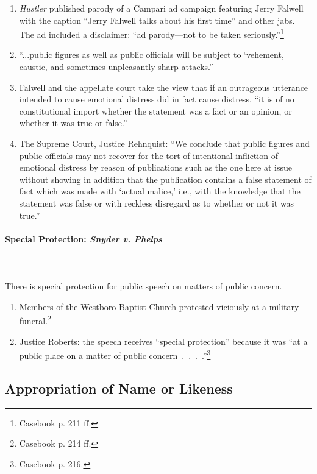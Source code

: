\begin{enumerate}
    \item \emph{Hustler} published parody of a Campari ad campaign featuring 
    Jerry Falwell with the caption ``Jerry Falwell talks about his first 
    time'' and other jabs. The ad included a disclaimer: ``ad parody---not to 
    be taken seriously.''\footnote{Casebook p. 211 ff.}
    \item ``...public figures as well as public officials will be subject to 
    `vehement, caustic, and sometimes unpleasantly sharp 
    attacks.''
    \item Falwell and the appellate court take the view that if an outrageous 
    utterance intended to cause emotional distress did in fact cause distress, 
    ``it is of no constitutional import whether the statement was a fact or an 
    opinion, or whether it was true or false.''
    \item The Supreme Court, Justice Rehnquist: ``We conclude that public 
    figures and public officials may not recover for the tort of intentional 
    infliction of emotional distress by reason of publications such as the one 
    here at issue without showing in addition that the publication contains a 
    false statement of fact which was made with `actual malice,' i.e., with 
    the knowledge that the statement was false or with reckless disregard as 
    to whether or not it was true.''
\end{enumerate}

\paragraph{Special Protection: \emph{Snyder v. Phelps}}
~\\\\
There is special protection for public speech on matters of public concern.

\begin{enumerate}
    \item Members of the Westboro Baptist Church protested viciously at a 
    military funeral.\footnote{Casebook p. 214 ff.}
    \item Justice Roberts: the speech receives ``special protection'' because it 
    was ``at a public place on a matter of public 
    concern~.~.~.~.''\footnote{Casebook p. 216.}
\end{enumerate}

\subsection{Appropriation of Name or Likeness}

